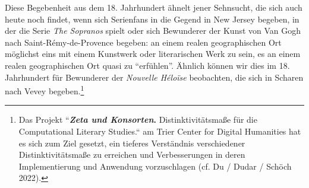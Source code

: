 \documentclass[
  12pt,
  letterpaper,
  DIV=11,
  numbers=noendperiod]{scrreprt}
\begin{document}
Diese Begebenheit aus dem 18. Jahrhundert ähnelt jener Sehnsucht, die
sich auch heute noch findet, wenn sich Serienfans in die Gegend in New
Jersey begeben, in der die Serie \emph{The Sopranos} spielt oder sich
Bewunderer der Kunst von Van Gogh nach Saint-Rémy-de-Provence begeben:
an einem realen geographischen Ort möglichst eins mit einem Kunstwerk
oder literarischen Werk zu sein, es an einem realen geographischen Ort
quasi zu ``erfühlen''. Ähnlich können wir dies im 18. Jahrhundert für
Bewunderer der \emph{Nouvelle Héloïse} beobachten, die sich in Scharen
nach Vevey begeben.\footnote{Das Projekt ``\textbf{\emph{Zeta und
  Konsorten}.} Distinktivitätsmaße für die Computational Literary
  Studies.`` am Trier Center for Digital Humanities hat es sich zum Ziel
  gesetzt, ein tieferes Verständnis verschiedener Distinktivitätsmaße zu
  erreichen und Verbesserungen in deren Implementierung und Anwendung
  vorzuschlagen (cf. Du / Dudar / Schöch 2022).}
\end{document}
